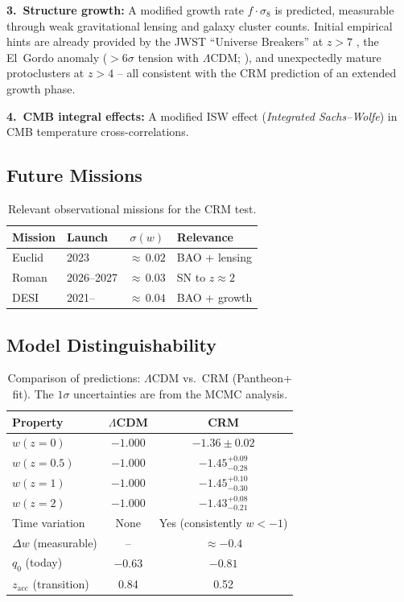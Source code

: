 \documentclass[aps,prd,twocolumn,superscriptaddress,nofootinbib]{revtex4-2}
\begin{document}
\textbf{3.~Structure growth:} A modified growth rate $f \cdot \sigma_8$ is predicted, measurable through weak gravitational lensing and galaxy cluster counts. Initial empirical hints are already provided by the JWST ``Universe Breakers'' at $z > 7$ \cite{Labbe2023}, the El~Gordo anomaly ($> 6\sigma$ tension with $\Lambda$CDM; \cite{Asencio2023}), and unexpectedly mature protoclusters at $z > 4$ \cite{Miller2018} -- all consistent with the CRM prediction of an extended growth phase.

\textbf{4.~CMB integral effects:} A modified ISW effect (\textit{Integrated Sachs--Wolfe}) in CMB temperature cross-correlations.

\subsection{Future Missions}

\begin{table}[htbp]
\centering
\caption{Relevant observational missions for the CRM test.}
\label{tab:missions}
\small
\begin{tabular}{llcl}
\toprule
\textbf{Mission} & \textbf{Launch} & $\sigma(w)$ & \textbf{Relevance} \\
\midrule
Euclid & 2023 & ${\approx}\,0.02$ & BAO + lensing \\
Roman & 2026--2027 & ${\approx}\,0.03$ & SN to $z \approx 2$ \\
DESI & 2021-- & ${\approx}\,0.04$ & BAO + growth \\
\bottomrule
\end{tabular}
\end{table}


\subsection{Model Distinguishability}

\begin{table}[htbp]
\centering
\caption{Comparison of predictions: $\Lambda$CDM vs.\ CRM (Pantheon+ fit). The $1\sigma$ uncertainties are from the MCMC analysis.}
\label{tab:predictions}
\begin{tabular}{lcc}
\toprule
\textbf{Property} & $\Lambda$CDM & CRM \\
\midrule
$w(z{=}0)$ & $-1.000$ & $-1.36 \pm 0.02$ \\
$w(z{=}0.5)$ & $-1.000$ & $-1.45^{+0.09}_{-0.28}$ \\
$w(z{=}1)$ & $-1.000$ & $-1.45^{+0.10}_{-0.30}$ \\
$w(z{=}2)$ & $-1.000$ & $-1.43^{+0.08}_{-0.21}$ \\
Time variation & None & Yes (consistently $w < -1$) \\
$\Delta w$ (measurable) & -- & $\approx -0.4$ \\
$q_0$ (today) & $-0.63$ & $-0.81$ \\
$z_{\mathrm{acc}}$ (transition) & 0.84 & 0.52 \\
\bottomrule
\end{tabular}
\end{table}
\end{document}
